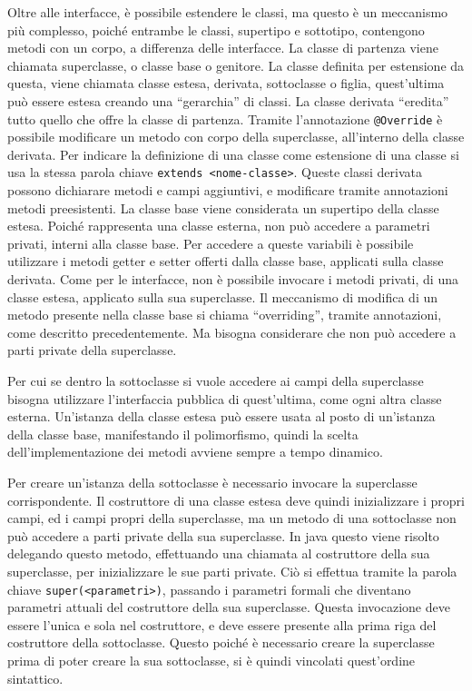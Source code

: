 \documentclass{article}
\numberwithin{equation}{subsection}
\begin{document}
Oltre alle interfacce, è possibile estendere le classi, ma questo è un meccanismo più complesso, poiché entrambe le classi, supertipo e sottotipo, contengono metodi con un corpo, 
a differenza delle interfacce. La classe di partenza viene chiamata superclasse, o classe base o genitore. La classe definita per estensione da questa, viene chiamata classe estesa, 
derivata, sottoclasse o figlia, quest'ultima può essere estesa creando una ``gerarchia'' di classi. 
La classe derivata ``eredita'' tutto quello che offre la classe di partenza. Tramite l'annotazione \verb|@Override| è possibile modificare un metodo con corpo della superclasse, 
all'interno della classe derivata. 
Per indicare la definizione di una classe come estensione di una classe si usa la stessa parola chiave \verb|extends <nome-classe>|. Queste classi derivata possono dichiarare 
metodi e campi aggiuntivi, e modificare tramite annotazioni metodi preesistenti. La classe base viene considerata un supertipo della classe estesa. Poiché rappresenta una classe 
esterna, non può accedere a parametri privati, interni alla classe base. Per accedere a queste variabili è possibile utilizzare i metodi getter e setter offerti dalla classe 
base, applicati sulla classe derivata. 
Come per le interfacce, non è possibile invocare i metodi privati, di una classe estesa, applicato sulla sua superclasse. 
Il meccanismo di modifica di un metodo presente nella classe base si chiama ``overriding'', tramite annotazioni, come descritto precedentemente. Ma bisogna considerare che non 
può accedere a parti private della superclasse. 

Per cui se dentro la sottoclasse si vuole accedere ai campi della superclasse bisogna utilizzare l'interfaccia pubblica di quest'ultima, come ogni altra classe esterna. 
Un'istanza della classe estesa può essere usata al posto di un'istanza della classe base, manifestando il polimorfismo, quindi la scelta dell'implementazione dei metodi avviene sempre 
a tempo dinamico. 


Per creare un'istanza della sottoclasse è necessario invocare la superclasse corrispondente. Il costruttore di una classe estesa deve quindi inizializzare i propri campi, ed i 
campi propri della superclasse, ma un metodo di una sottoclasse non può accedere a parti private della sua superclasse. In java questo viene risolto delegando questo metodo, 
effettuando una chiamata al costruttore della sua superclasse, per inizializzare le sue parti private. Ciò si effettua tramite la parola chiave \verb|super(<parametri>)|, 
passando i parametri formali che diventano parametri attuali del costruttore della sua superclasse. Questa invocazione deve essere l'unica e sola nel costruttore, e deve 
essere presente alla prima riga del costruttore della sottoclasse. Questo poiché è necessario creare la superclasse prima di poter creare la sua sottoclasse, si è quindi vincolati 
quest'ordine sintattico. 
\end{document}
